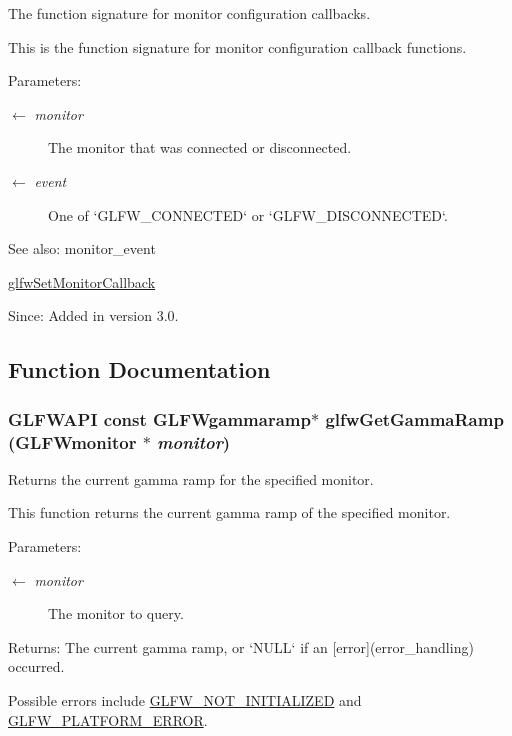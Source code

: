 The function signature for monitor configuration callbacks. 

This is the function signature for monitor configuration callback functions.

\begin{Desc}
\item[Parameters:]
\begin{description}
\item[\mbox{$\leftarrow$} {\em monitor}]The monitor that was connected or disconnected. \item[\mbox{$\leftarrow$} {\em event}]One of `GLFW\_\-CONNECTED` or `GLFW\_\-DISCONNECTED`.\end{description}
\end{Desc}
\begin{Desc}
\item[See also:]monitor\_\-event 

\hyperlink{group__monitor_gcfa9978e57c73670577d530df23bf275}{glfwSetMonitorCallback}\end{Desc}
\begin{Desc}
\item[Since:]Added in version 3.0. \end{Desc}


\subsection{Function Documentation}
\hypertarget{group__monitor_geeac9198f3c91b83440eed679441f76b}{
\subsubsection[glfwGetGammaRamp]{\setlength{\rightskip}{0pt plus 5cm}GLFWAPI const {\bf GLFWgammaramp}$\ast$ glfwGetGammaRamp ({\bf GLFWmonitor} $\ast$ {\em monitor})}}
\label{group__monitor_geeac9198f3c91b83440eed679441f76b}


Returns the current gamma ramp for the specified monitor. 

This function returns the current gamma ramp of the specified monitor.

\begin{Desc}
\item[Parameters:]
\begin{description}
\item[\mbox{$\leftarrow$} {\em monitor}]The monitor to query. \end{description}
\end{Desc}
\begin{Desc}
\item[Returns:]The current gamma ramp, or `NULL` if an \mbox{[}error\mbox{]}(error\_\-handling) occurred.\end{Desc}
Possible errors include \hyperlink{group__errors_g2374ee02c177f12e1fa76ff3ed15e14a}{GLFW\_\-NOT\_\-INITIALIZED} and \hyperlink{group__errors_gd44162d78100ea5e87cdd38426b8c7a1}{GLFW\_\-PLATFORM\_\-ERROR}.

